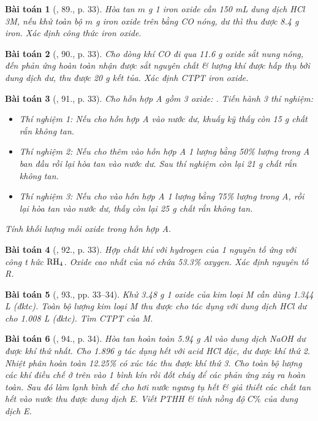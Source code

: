\documentclass{article}
\newtheorem{baitoan}{Bài toán}
\begin{document}
\begin{baitoan}[\cite{An_400_BT_Hoa_Hoc_9}, 89., p. 33]
	Hòa tan $m$ {\rm g} 1 iron oxide cần {\rm150 mL} dung dịch {\rm HCl 3M}, nếu khử toàn bộ $m$ {\rm g} iron oxide trên bằng {\rm CO} nóng, dư thì thu được {\rm8.4 g} iron. Xác định công thức iron oxide.
\end{baitoan}

\begin{baitoan}[\cite{An_400_BT_Hoa_Hoc_9}, 90., p. 33]
	Cho dòng khí {\rm CO} đi qua {\rm11.6 g} oxide sắt nung nóng, đến phản ứng hoàn toàn nhận được sắt nguyên chất \& lượng khí được hấp thụ bởi dung dịch {\rm{}} dư, thu được {\rm20 g} kết tủa. Xác định {\rm CTPT} iron oxide.
\end{baitoan}

\begin{baitoan}[\cite{An_400_BT_Hoa_Hoc_9}, 91., p. 33]
	Cho hỗn hợp A gồm 3 oxide: {\rm{}}. Tiến hành 3 thí nghiệm:
	\begin{itemize}
		\item Thí nghiệm 1: Nếu cho hỗn hợp A vào nước dư, khuấy kỹ thấy còn {\rm15 g} chất rắn không tan.
		\item Thí nghiệm 2: Nếu cho thêm vào hỗn hợp A 1 lượng {\rm{}} bằng {\rm50\%} lượng {\rm{}} trong A ban đầu rồi lại hòa tan vào nước dư. Sau thí nghiệm còn lại {\rm21 g} chất rắn không tan.
		\item Thí nghiệm 3: Nếu cho vào hỗn hợp A 1 lượng {\rm{}} bằng {\rm75\%} lượng {\rm{}} trong A, rồi lại hòa tan vào nước dư, thấy còn lại {\rm25 g} chất rắn không tan.
	\end{itemize}
	Tính khối lượng mỗi oxide trong hỗn hợp A.
\end{baitoan}

\begin{baitoan}[\cite{An_400_BT_Hoa_Hoc_9}, 92., p. 33]
	Hợp chất khí với hydrogen của 1 nguyên tố ứng với công t hức $\rm RH_4$. Oxide cao nhất của nó chứa {\rm53.3\%} oxygen. Xác định nguyên tố R.
\end{baitoan}

\begin{baitoan}[\cite{An_400_BT_Hoa_Hoc_9}, 93., pp. 33--34]
	Khử {\rm3.48 g} 1 oxide của kim loại M cần dùng {\rm1.344 L } (đktc). Toàn bộ lượng kim loại M thu được cho tác dụng với dung dịch {\rm HCl} dư cho {\rm1.008 L } (đktc). Tìm {\rm CTPT} của M.
\end{baitoan}

\begin{baitoan}[\cite{An_400_BT_Hoa_Hoc_9}, 94., p. 34]
	Hòa tan hoàn  toàn {\rm5.94 g Al} vào dung dịch {\rm NaOH} dư được khí thứ nhất. Cho {\rm1.896 g } tác dụng hết với acid {\rm HCl} đặc, dư được khí thứ 2. Nhiệt phân hoàn toàn {\rm12.25\% } có xúc tác thu được khí thứ 3. Cho toàn bộ lượng các khí điều chế ở trên vào 1 bình kín rồi đốt cháy để các phản ứng xảy ra hoàn toàn. Sau đó làm lạnh bình để cho hơi nước ngưng tụ hết \& giả thiết các chất tan hết vào nước thu được dung dịch E. Viết {\rm PTHH} \& tính nồng độ $C\%$ của dung dịch E.
\end{baitoan}
\end{document}
